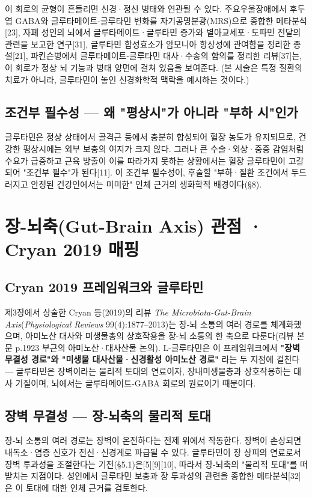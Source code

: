 \documentclass[11pt,oneside]{book}
\begin{document}
이 회로의 균형이 흔들리면 신경·정신 병태와 연관될 수 있다. 주요우울장애에서 후두엽 GABA와 글루타메이트-글루타민 변화를 자기공명분광(MRS)으로 종합한 메타분석[23], 자폐 성인의 뇌에서 글루타메이트·글루타민 증가와 별아교세포·도파민 전달의 관련을 보고한 연구[31], 글루타민 합성효소가 암모니아 항상성에 관여함을 정리한 종설[21], 파킨슨병에서 글루타메이트-글루타민 대사·수송의 함의를 정리한 리뷰[37]는, 이 회로가 정상 뇌 기능과 병태 양면에 걸쳐 있음을 보여준다. (본 서술은 특정 질환의 치료가 아니라, 글루타민이 놓인 신경화학적 맥락을 예시하는 것이다.)

\subsection{조건부 필수성 — 왜 "평상시"가 아니라 "부하 시"인가}
글루타민은 정상 상태에서 골격근 등에서 충분히 합성되어 혈장 농도가 유지되므로, 건강한 평상시에는 외부 보충의 여지가 크지 않다. 그러나 큰 수술·외상·중증 감염처럼 수요가 급증하고 근육 방출이 이를 따라가지 못하는 상황에서는 혈장 글루타민이 고갈되어 "조건부 필수"가 된다[11]. 이 조건부 필수성이, 후술할 "부하·질환 조건에서 두드러지고 안정된 건강인에서는 미미한" 인체 근거의 생화학적 배경이다(§8).

\section{장-뇌축(Gut-Brain Axis) 관점 · Cryan 2019 매핑}
\subsection{Cryan 2019 프레임워크와 글루타민}
제3장에서 상술한 Cryan 등(2019)의 리뷰 \textit{The Microbiota-Gut-Brain Axis}(\textit{Physiological Reviews} 99(4):1877–2013)는 장-뇌 소통의 여러 경로를 체계화했으며, 아미노산 대사와 미생물총의 상호작용을 장-뇌 소통의 한 축으로 다룬다(리뷰 본문 p.1923 부근의 아미노산·대사산물 논의). L-글루타민은 이 프레임워크에서 \textbf{"장벽 무결성 경로"와 "미생물 대사산물·신경활성 아미노산 경로"} 라는 두 지점에 걸친다 — 글루타민은 장벽이라는 물리적 토대의 연료이자, 장내미생물총과 상호작용하는 대사 기질이며, 뇌에서는 글루타메이트-GABA 회로의 원료이기 때문이다.

\subsection{장벽 무결성 — 장-뇌축의 물리적 토대}
장-뇌 소통의 여러 경로는 장벽이 온전하다는 전제 위에서 작동한다. 장벽이 손상되면 내독소·염증 신호가 전신·신경계로 파급될 수 있다. 글루타민이 장 상피의 연료로서 장벽 투과성을 조절한다는 기전(§5.1)은[5][9][10], 따라서 장-뇌축의 "물리적 토대"를 떠받치는 지점이다. 성인에서 글루타민 보충과 장 투과성의 관련을 종합한 메타분석[32]은 이 토대에 대한 인체 근거를 검토한다.
\end{document}
